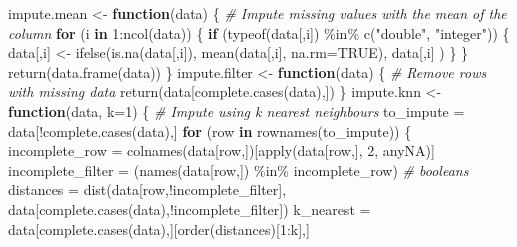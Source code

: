 \documentclass[
]{article}
\newenvironment{Shaded}{\begin{snugshade}}{\end{snugshade}}
\newcommand{\AttributeTok}[1]{\textcolor[rgb]{0.77,0.63,0.00}{#1}}
\newcommand{\CommentTok}[1]{\textcolor[rgb]{0.56,0.35,0.01}{\textit{#1}}}
\newcommand{\ConstantTok}[1]{\textcolor[rgb]{0.00,0.00,0.00}{#1}}
\newcommand{\ControlFlowTok}[1]{\textcolor[rgb]{0.13,0.29,0.53}{\textbf{#1}}}
\newcommand{\DecValTok}[1]{\textcolor[rgb]{0.00,0.00,0.81}{#1}}
\newcommand{\FunctionTok}[1]{\textcolor[rgb]{0.00,0.00,0.00}{#1}}
\newcommand{\NormalTok}[1]{#1}
\newcommand{\OtherTok}[1]{\textcolor[rgb]{0.56,0.35,0.01}{#1}}
\newcommand{\SpecialCharTok}[1]{\textcolor[rgb]{0.00,0.00,0.00}{#1}}
\newcommand{\StringTok}[1]{\textcolor[rgb]{0.31,0.60,0.02}{#1}}
\begin{document}
\begin{Shaded}
\begin{Highlighting}[]
\NormalTok{impute.mean }\OtherTok{\textless{}{-}} \ControlFlowTok{function}\NormalTok{(data) \{}
    \CommentTok{\#\textquotesingle{} Impute missing values with the mean of the column}
    \ControlFlowTok{for}\NormalTok{ (i }\ControlFlowTok{in} \DecValTok{1}\SpecialCharTok{:}\FunctionTok{ncol}\NormalTok{(data)) \{}
        \ControlFlowTok{if}\NormalTok{ (}\FunctionTok{typeof}\NormalTok{(data[,i]) }\SpecialCharTok{\%in\%} \FunctionTok{c}\NormalTok{(}\StringTok{"double"}\NormalTok{, }\StringTok{"integer"}\NormalTok{)) \{}
\NormalTok{            data[,i] }\OtherTok{\textless{}{-}} \FunctionTok{ifelse}\NormalTok{(}\FunctionTok{is.na}\NormalTok{(data[,i]),}
                \FunctionTok{mean}\NormalTok{(data[,i], }\AttributeTok{na.rm=}\ConstantTok{TRUE}\NormalTok{),}
\NormalTok{                data[,i]}
\NormalTok{            )}
\NormalTok{        \}}
\NormalTok{    \}}
    \FunctionTok{return}\NormalTok{(}\FunctionTok{data.frame}\NormalTok{(data))}
\NormalTok{\}}
\NormalTok{impute.filter }\OtherTok{\textless{}{-}} \ControlFlowTok{function}\NormalTok{(data) \{}
    \CommentTok{\#\textquotesingle{} Remove rows with missing data}
    \FunctionTok{return}\NormalTok{(data[}\FunctionTok{complete.cases}\NormalTok{(data),])}
\NormalTok{\}}
\NormalTok{impute.knn }\OtherTok{\textless{}{-}} \ControlFlowTok{function}\NormalTok{(data, }\AttributeTok{k=}\DecValTok{1}\NormalTok{) \{}
    \CommentTok{\#\textquotesingle{} Impute using k nearest neighbours}
\NormalTok{    to\_impute }\OtherTok{=}\NormalTok{ data[}\SpecialCharTok{!}\FunctionTok{complete.cases}\NormalTok{(data),]}
    \ControlFlowTok{for}\NormalTok{ (row }\ControlFlowTok{in} \FunctionTok{rownames}\NormalTok{(to\_impute)) \{}
\NormalTok{        incomplete\_row }\OtherTok{=} \FunctionTok{colnames}\NormalTok{(data[row,])[}\FunctionTok{apply}\NormalTok{(data[row,], }\DecValTok{2}\NormalTok{, anyNA)]}
\NormalTok{        incomplete\_filter }\OtherTok{=}\NormalTok{ (}\FunctionTok{names}\NormalTok{(data[row,]) }\SpecialCharTok{\%in\%}\NormalTok{ incomplete\_row) }\CommentTok{\# booleans}
\NormalTok{        distances }\OtherTok{=} \FunctionTok{dist}\NormalTok{(data[row,}\SpecialCharTok{!}\NormalTok{incomplete\_filter], data[}\FunctionTok{complete.cases}\NormalTok{(data),}\SpecialCharTok{!}\NormalTok{incomplete\_filter])}
\NormalTok{        k\_nearest }\OtherTok{=}\NormalTok{ data[}\FunctionTok{complete.cases}\NormalTok{(data),][}\FunctionTok{order}\NormalTok{(distances)[}\DecValTok{1}\SpecialCharTok{:}\NormalTok{k],]}
        

\end{Highlighting}
\end{Shaded}
\end{document}
